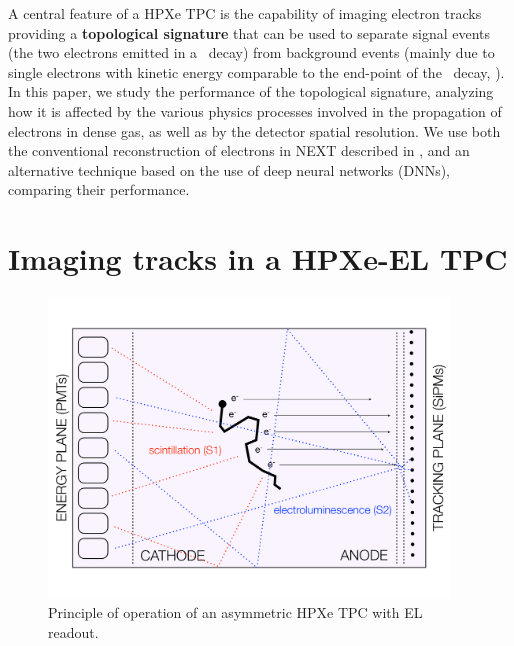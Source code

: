 \documentclass[a4paper,11pt]{article}
\begin{document}
A central feature of a HPXe TPC is the capability of imaging electron tracks providing a {\bf topological signature} that can be used to separate signal events (the two electrons emitted in a \bbonu\ decay) from background events (mainly due to single electrons with kinetic energy comparable to the end-point of the \bbonu\ decay, \Qbb). In this paper, we study the performance of the topological signature, analyzing how it is affected by the various physics processes involved in the propagation of electrons in dense gas, as well as by the detector spatial resolution. We use both the conventional reconstruction of electrons in NEXT described in \cite{NEXT_topology}, and an alternative technique based on the use of deep neural networks (DNNs), comparing their performance. 

\section{Imaging tracks in a HPXe-EL TPC}
\label{sec.topology}

\begin{figure}[!htb]
\centering
\includegraphics[width= 0.95\textwidth]{fig/nextEL.pdf}
\caption{Principle of operation of an asymmetric HPXe TPC with EL readout.} \label{fig.SS}
\end{figure}
\end{document}
